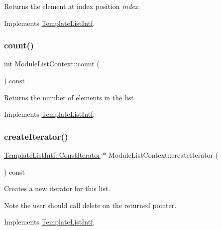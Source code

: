 Returns the element at index position {\itshape index}. 

Implements \mbox{\hyperlink{class_template_list_intf_aa51e57e72eacf4e8ce1055ee30a0f7f8}{Template\+List\+Intf}}.

\mbox{\label{class_module_list_context_a65f2757f90eb682cb7551545f29f01ee}} 
\subsubsection{\texorpdfstring{count()}{count()}}
{\footnotesize\ttfamily int Module\+List\+Context\+::count (\begin{DoxyParamCaption}{ }\end{DoxyParamCaption}) const\hspace{0.3cm}{\ttfamily [virtual]}}

Returns the number of elements in the list 

Implements \mbox{\hyperlink{class_template_list_intf_a329e49e33484c2aa5106aac1bf4e5216}{Template\+List\+Intf}}.

\mbox{\label{class_module_list_context_a43d8a58bc49f64bf7bdc0b68c03c83f2}} 
\subsubsection{\texorpdfstring{createIterator()}{createIterator()}}
{\footnotesize\ttfamily \mbox{\hyperlink{class_template_list_intf_1_1_const_iterator}{Template\+List\+Intf\+::\+Const\+Iterator}} $\ast$ Module\+List\+Context\+::create\+Iterator (\begin{DoxyParamCaption}{ }\end{DoxyParamCaption}) const\hspace{0.3cm}{\ttfamily [virtual]}}

Creates a new iterator for this list. \begin{DoxyNote}{Note}
the user should call delete on the returned pointer. 
\end{DoxyNote}


Implements \mbox{\hyperlink{class_template_list_intf_a56b82384db24c3e121076a1da046d378}{Template\+List\+Intf}}.

